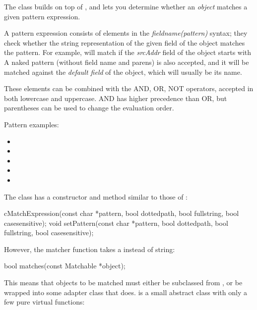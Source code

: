 The  class builds on top of
, and lets you determine whether an \textit{object}
matches a given pattern expression.

A pattern expression consists of elements in the
\textit{fieldname(pattern)} syntax; they check whether the string
representation of the given field of the object matches the pattern. For
example,  will match if the \textit{srcAddr}
field of the object starts with  A naked pattern (without
field name and parens) is also accepted, and it will be matched against the
\textit{default field} of the object, which will usually be its name.

These elements can be combined with the AND, OR, NOT operators, accepted in
both lowercase and uppercase. AND has higher precedence than OR, but
parentheses can be used to change the evaluation order.

Pattern examples:

\begin{itemize}
 \item {}
 \item {}
 \item {}
 \item {}
 \item {}
\end{itemize}

The  class has a constructor and 
method similar to those of :

\begin{cpp}
cMatchExpression(const char *pattern, bool dottedpath, bool fullstring,
                bool casesensitive);
void setPattern(const char *pattern, bool dottedpath, bool fullstring,
                bool casesensitive);
\end{cpp}

However, the matcher function takes a 
instead of string:

\begin{cpp}
bool matches(const Matchable *object);
\end{cpp}

This means that objects to be matched must either be subclassed from
, or be wrapped into some adapter class
that does.  is a small abstract class
with only a few pure virtual functions:

